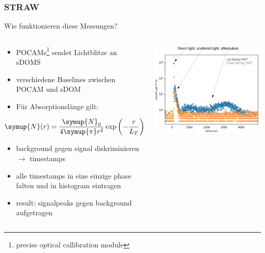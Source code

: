 \documentclass[aspectratio=1610, 9pt]{beamer}
\begin{document}
\begin{frame}\frametitle{STRAW}
  \begin{block}{Wie funktionieren diese Messungen?}
    \begin{columns}
    \begin{column}[c]{0.45\textwidth}
      \begin{itemize}
        \item POCAMs\footnote{precise optical callibration module} sendet Lichtblitze an sDOMS
        \item verschiedene Baselines zwischen POCAM und sDOM
        \item F\"ur Absorptionsl\"ange gilt: 
      \end{itemize}
      \begin{equation}
        \symup{N}(r) = \frac{\symup{N}_0}{4\symup{\pi}r^2}\exp{\left(-\frac{r}{L_{T}}\right)}A_{text{det}}
      \end{equation}
      \begin{itemize}
        \item background gegen signal diskriminieren $\to$ timestamps
        \item alle timestamps in eine einzige phase falten und in histogram eintragen
        \item result: signalpeaks gegen background aufgetragen
      \end{itemize}
    \end{column}
    \begin{column}[c]{0.45\textwidth}
      \includegraphics{images/straw3.png}
    \end{column}
    \end{columns}
  \end{block}
\end{frame}
\end{document}

